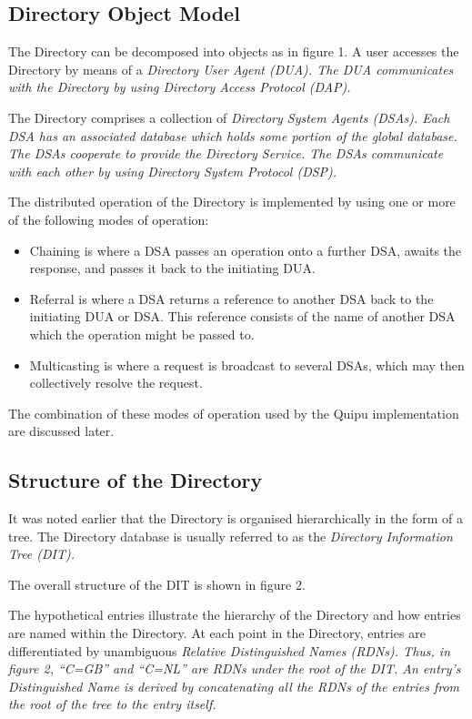 \subsection{Directory Object Model}
The Directory can be decomposed into objects as in figure 1.
A user accesses the Directory by means of a 
\it
Directory User Agent
\rm
(DUA).
The DUA communicates with the Directory by using 
\it
Directory Access Protocol
\rm
(DAP).

\begin{figure}
\begin{minipage}\columnwidth
\small
\relax\centerline{\box\graph}
\end{minipage}
\end{figure}

The Directory comprises a collection of 
\it
Directory System Agents
\rm
(DSAs). Each
DSA has an associated database which holds some portion of the global
database.  The
DSAs cooperate to provide the Directory Service.  The DSAs communicate with
each other by using
\it
Directory System Protocol
\rm
(DSP).

The distributed operation of the Directory is implemented by using one or
more of the following modes of operation:
\begin{itemize}
\item
Chaining is where a DSA passes an operation onto a further DSA, awaits the
response, and passes it back to the initiating DUA.
\item
Referral is where a DSA returns a reference to another DSA back to the
initiating DUA or DSA.  This reference consists of the name of another DSA 
which the operation might be passed to.
\item
Multicasting is where a request is broadcast to several DSAs, which may
then collectively resolve the request.
\end{itemize}
The combination of these modes of operation used by the Quipu implementation
are discussed later.
\subsection{Structure of the Directory}

It was noted earlier that the Directory is organised 
hierarchically in the form of
a tree.  The Directory database is usually referred to as the
\it
Directory Information Tree
\rm
(DIT).

The overall structure of the DIT is shown in figure 2.

The hypothetical
entries illustrate the hierarchy of the Directory and how entries are named
within the Directory.  At each point in the Directory, entries are
differentiated by unambiguous
\it
Relative Distinguished Names
\rm
(RDNs). Thus, in figure 2, ``C=GB'' and ``C=NL'' are RDNs under the root of the
DIT.
An entry's
\it
Distinguished Name
\rm
is derived by concatenating all the RDNs of the entries from the root of the
tree to the entry itself. 

